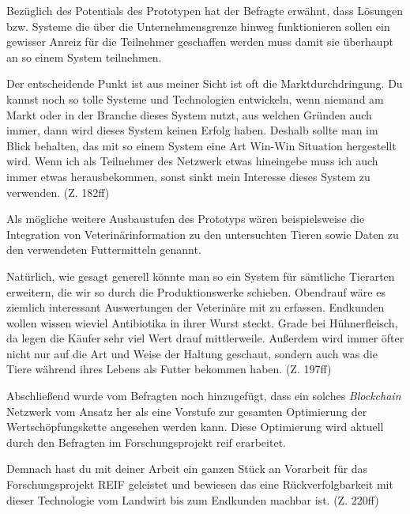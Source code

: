 Bezüglich des Potentials des Prototypen hat der Befragte erwähnt, dass Lösungen bzw. Systeme die über die Unternehmensgrenze hinweg funktionieren sollen ein gewisser Anreiz für die Teilnehmer geschaffen werden muss damit sie überhaupt an so einem System teilnehmen.

\begin{displayquote}
    \glqq Der entscheidende Punkt ist aus meiner Sicht ist oft die Marktdurchdringung. Du kannst noch so tolle Systeme und Technologien entwickeln, wenn niemand am Markt oder in der Branche dieses System nutzt, aus welchen Gründen auch immer, dann wird dieses System keinen Erfolg haben. Deshalb sollte man im Blick behalten, das mit so einem System eine Art \glqq Win-Win\grqq{} Situation hergestellt wird. Wenn ich als Teilnehmer des Netzwerk etwas hineingebe muss ich auch immer etwas herausbekommen, sonst sinkt mein Interesse dieses System zu verwenden.\grqq{} (Z. 182ff)
\end{displayquote}

Als mögliche weitere Ausbaustufen des Prototyps wären beispielsweise die Integration von Veterinärinformation zu den untersuchten Tieren sowie Daten zu den verwendeten Futtermitteln genannt.

\begin{displayquote}
    \glqq Natürlich, wie gesagt generell könnte man so ein System für sämtliche Tierarten erweitern, die wir so durch die Produktionswerke schieben. Obendrauf wäre es ziemlich interessant Auswertungen der Veterinäre mit zu erfassen. Endkunden wollen wissen wieviel Antibiotika in ihrer Wurst steckt. Grade bei Hühnerfleisch, da legen die Käufer sehr viel Wert drauf mittlerweile. Außerdem wird immer öfter nicht nur auf die Art und Weise der Haltung geschaut, sondern auch was die Tiere während ihres Lebens als Futter bekommen haben.\grqq{} (Z. 197ff)
\end{displayquote}

Abschließend wurde vom Befragten noch hinzugefügt, dass ein solches \textit{Blockchain} Netzwerk vom Ansatz her als eine Vorstufe zur gesamten Optimierung der Wertschöpfungskette angesehen werden kann. Diese Optimierung wird aktuell durch den Befragten im Forschungsprojekt \ac{reif} erarbeitet.

\begin{displayquote}
    \glqq Demnach hast du mit deiner Arbeit ein ganzen Stück an Vorarbeit für das Forschungsprojekt REIF geleistet und bewiesen das eine Rückverfolgbarkeit mit dieser Technologie vom Landwirt bis zum Endkunden machbar ist.\grqq{} (Z. 220ff)
\end{displayquote}

\newpage

